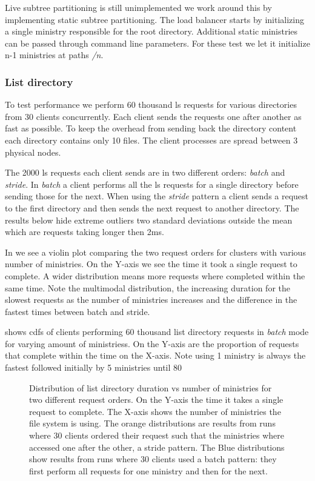 Live subtree partitioning is still unimplemented we work around this by implementing static subtree partitioning. The load balancer starts by initializing a single ministry responsible for the root directory. Additional static ministries can be passed through command line parameters. For these test we let it initialize n-1 ministries at paths \textsl{/n}.

\subsubsection{List directory}
To test performance we perform 60 thousand ls requests for various directories from 30 clients concurrently. Each client sends the requests one after another as fast as possible. To keep the overhead from sending back the directory content each directory contains only 10 files. The client processes are spread between 3 physical nodes. 

The 2000 ls requests each client sends are in two different orders: \textit{batch} and \textit{stride}. In \textit{batch} a client performs all the ls requests for a single directory before sending those for the next. When using the \textit{stride} pattern a client sends a request to the first directory and then sends the next request to another directory. The results below hide extreme outliers two standard deviations outside the mean which are requests taking longer then 2ms.

In  we see a violin plot comparing the two request orders for clusters with various number of ministries. On the Y-axis we see the time it took a single request to complete. A wider distribution means more requests where completed within the same time. Note the multimodal distribution, the increasing duration for the slowest requests as the number of ministries increases and the difference in the fastest times between batch and stride.

 shows \acp{cdf} of clients performing 60 thousand list directory requests in \textit{batch} mode for varying amount of ministriess. On the Y-axis are the proportion of requests that complete within the time on the X-axis. Note using 1 ministry is always the fastest followed initially by 5 ministries until 80%

\begin{figure}[htbp]
	\centering
	
	\caption{Distribution of list directory duration vs number of ministries for two different request orders. On the Y-axis the time it takes a single request to complete. The X-axis shows the number of ministries the file system is using. The orange distributions are results from runs where 30 clients ordered their request such that the ministries where accessed one after the other, a stride pattern. The Blue distributions show results from runs where 30 clients used a batch pattern: they first perform all requests for one ministry and then for the next.}
	\label{fig:ls_vs_ministries}
\end{figure}%

